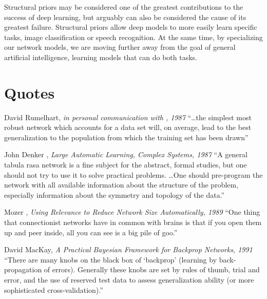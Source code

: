 \documentclass[thesis]{subfiles}
\begin{document}
    Structural priors may be considered one of the greatest contributions to the success of deep learning, but arguably can also be considered the cause of its greatest failure. Structural priors allow deep models to more easily learn specific tasks, \eg image classification or speech recognition. At the same time, by specializing our network models, we are moving further away from the goal of general artificial intelligence, \ie learning models that can do both tasks.
    
    \section{Quotes}
    
	\begin{chapquote}{David Rumelhart, \textit{in personal communication with \citet{hanson1989comparing}, 1987}}
	``\ldots the simplest most robust network which accounts for a data set will, on average, lead to the best generalization to the population from which the training set has been drawn''
	\end{chapquote}
	
	
	\begin{chapquote}{John Denker \etal, \textit{Large Automatic Learning, Complex Systems, 1987}}
		``A general tabula rasa network is a fine subject for the abstract, formal studies, but one should not try to use it to solve practical problems. \ldots One should pre-program the network with all available information about the structure of the problem, especially information about the symmetry and topology of the data.''
	\end{chapquote}
	
	
	\begin{chapquote}{Mozer \etal, \textit{Using Relevance to Reduce Network Size Automatically, 1989}}
	``One thing that connectionist networks have in common with brains is that if you open them up and peer inside, all you can see is a big pile of goo.''
	\end{chapquote}
	
	
	\begin{chapquote}{David MacKay, \textit{A Practical Bayesian Framework for Backprop Networks, 1991}}
		``There are many knobs on the black box of `backprop' (learning by back-propagation of
		errors). Generally these knobs are set by rules of thumb, trial and error, and the use of reserved test data to assess generalization ability (or more sophisticated cross-validation).''
	\end{chapquote}
	
\end{document}
